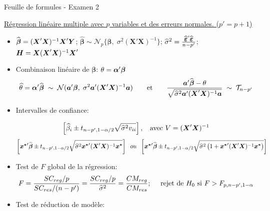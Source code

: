\documentclass[a4paper, 11pt]{article}
\newcommand{\N}{\mathcal{N}}
\newcommand{\bm}{\boldmath}
\newcommand{\um}{\unboldmath}
\newcommand{\boY}{\mbox{\bm$Y$\um}}
\newcommand{\bobeta}{\mbox{$\boldsymbol\beta$}}
\newcommand{\boeps}{\mbox{\bm$\varepsilon$\um}}
\newcommand{\boalpha}{\mbox{\bm$\alpha$\um}}
\newcommand{\bo}[1]{\mbox{\bm$#1$\um}}
\newcommand{\boX}{\mbox{$\boldsymbol{X}$}}
\newcommand{\hbobeta}{\widehat{\bobeta}}
\newcommand{\hboeps}{\widehat{\boeps}}
\newcommand{\boH}{\bo{H}}
\begin{document}
	
	\medskip
	\begin{center}
		{\Large Feuille de formules - Examen 2}
	\end{center}


\medskip
\underline{Régression linéaire multiple avec $p$ variables et des erreurs normales. ($p'=p+1$)} \\

\medskip\medskip
\begin{itemize}
	\item[$\bullet$] $\hbobeta=(\boX' \boX)^{-1} \boX' \boY$; \hspace{0.5 cm} $ \hbobeta \sim \mathcal{N}_p\{\bobeta,\; \sigma^2 (\boX'\boX)^{-1}\}$; \hspace{0.5 cm} $ \widehat{\sigma}^2 =\frac{\hboeps'\hboeps}{n-p'} $; \hspace{0.5 cm} $ \boH=\boX(\boX'\boX)^{-1}\boX'$

	\medskip\medskip\medskip\medskip
	\item[$\bullet$] Combinaison linéaire de $\bobeta$: $\theta = \boalpha' \bobeta $ 
	  $$ \widehat{\theta}  = \boalpha' \widehat{\bobeta} \; \sim \;  \N(\bo a'\bobeta, \; \sigma^2\bo a'(\boX'\boX)^{-1}\bo a) 
	  \quad\quad \text{et} \quad\quad
	  \frac{\bo a'\hbobeta-\theta}{\sqrt{\widehat{\sigma}^2\bo a'(\boX'\boX)^{-1}\bo a}} \; \sim \; \mathcal{T}_{n-p'}$$

	\medskip\medskip\medskip\medskip
	\item[$\bullet$] Intervalles de confiance: \medskip

$$\left[ \widehat\beta_i\pm t_{n-p',1-\alpha/2}\sqrt{\widehat{\sigma}^2 v_{ii}} \right], \; \; \mbox{ avec   } V = (\bo X' \bo X)^{-1} $$\medskip
$$ \left[\displaystyle\bo{x^*}'\hbobeta\pm t_{n-p', 1-\alpha/2}\sqrt{\widehat{\sigma}^2\bo{x^*}'(\boX'\boX)^{-1}\bo{x^*}}\right] \hspace{0.2 cm} ou \hspace{0.2 cm} \left[\bo{x^*}'\hbobeta\pm t_{n-p', 1-\alpha/2}\sqrt{\widehat{\sigma}^2\left(1+\bo{x^*}'(\boX'\boX)^{-1}\bo{x^*}\right)}\right]$$

	\medskip\medskip\medskip\medskip
	\item[$\bullet$] Test de $F$ global de la régression: \medskip
$$F={SC_{reg}/p\over SC_{res}/(n-p')}={SC_{reg}/p\over \widehat{\sigma}^2}= \frac{CM_{reg}}{CM_{res}}; \quad \mbox{ rejet de $H_0$ si } F > F_{p,n-p', 1-\alpha}$$
 
	\medskip\medskip\medskip\medskip
	\item[$\bullet$] Test de réduction de modèle: \medskip


\end{itemize}
\end{document}
